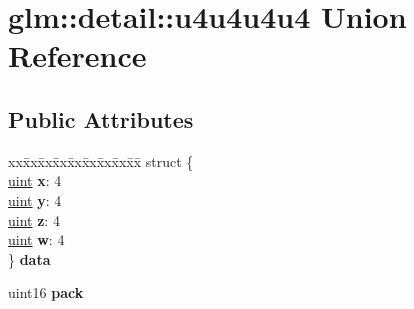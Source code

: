 \hypertarget{unionglm_1_1detail_1_1u4u4u4u4}{}\section{glm\+:\+:detail\+:\+:u4u4u4u4 Union Reference}
\label{unionglm_1_1detail_1_1u4u4u4u4}
\subsection*{Public Attributes}
\begin{DoxyCompactItemize}
\item 
\mbox{\label{unionglm_1_1detail_1_1u4u4u4u4_a138b91238bde678b330a15f1a02dc4a8}} 
\begin{tabbing}
xx\=xx\=xx\=xx\=xx\=xx\=xx\=xx\=xx\=\kill
struct \{\\
\mbox{\label{unionglm_1_1detail_1_1u4u4u4u4_ab669df18acc3a5afa63c94940158a2ad}} 
\hyperlink{group__core__precision_ga4fd29415871152bfb5abd588334147c8}{uint} {\bfseries x}: 4\\
\mbox{\label{unionglm_1_1detail_1_1u4u4u4u4_a6797a5bc829ba4eee4577afaa06b9a52}} 
\hyperlink{group__core__precision_ga4fd29415871152bfb5abd588334147c8}{uint} {\bfseries y}: 4\\
\mbox{\label{unionglm_1_1detail_1_1u4u4u4u4_a3043fb71e780209e76473406d3356b32}} 
\hyperlink{group__core__precision_ga4fd29415871152bfb5abd588334147c8}{uint} {\bfseries z}: 4\\
\mbox{\label{unionglm_1_1detail_1_1u4u4u4u4_a58e1c0d88acd50c5b19b8f94a621d94e}} 
\hyperlink{group__core__precision_ga4fd29415871152bfb5abd588334147c8}{uint} {\bfseries w}: 4\\
\} {\bfseries data}\\

\end{tabbing}\item 
\mbox{\label{unionglm_1_1detail_1_1u4u4u4u4_aa989a8fab51b41be68d0d07147fba3b8}} 
uint16 {\bfseries pack}
\end{DoxyCompactItemize}


